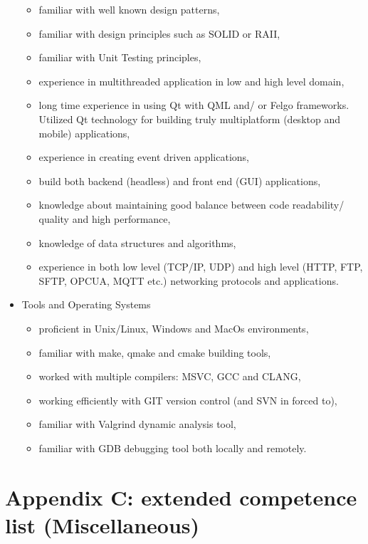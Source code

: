 \documentclass{tccv}
\begin{document}
\begin{itemize}
\begin{itemize}
			\item familiar with well known design patterns,
			\item familiar with design principles such as SOLID or RAII,
			\item familiar with Unit Testing principles,
			\item experience in multithreaded application in low and high level domain,
			\item long time experience in using Qt with QML and/ or Felgo frameworks. Utilized Qt technology for building truly multiplatform (desktop and mobile) applications,
			\item experience in creating event driven applications,
			\item build both backend (headless) and front end (GUI) applications,
			\item knowledge about maintaining good balance between code readability/ quality and high performance,
			\item knowledge of data structures and algorithms,
			\item experience in both low level (TCP/IP, UDP) and high level (HTTP, FTP, SFTP, OPCUA, MQTT etc.) networking protocols and applications.
		\end{itemize}
	\item Tools and Operating Systems
		\begin{itemize}
			\item proficient in Unix/Linux, Windows and MacOs environments,
			\item familiar with make, qmake and cmake building tools,
			\item worked with multiple compilers: MSVC, GCC and CLANG,
			\item working efficiently with GIT version control (and SVN in forced to),
			\item familiar with Valgrind dynamic analysis tool,
			\item familiar with GDB debugging tool both locally and remotely.		
		\end{itemize}
\end{itemize}

\clearpage

\section{Appendix C: extended competence list (Miscellaneous)}
\end{document}
